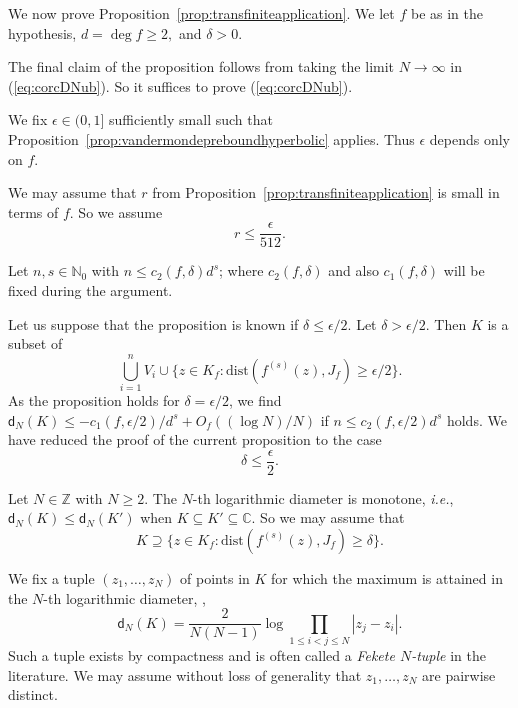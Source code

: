 \documentclass[12pt,oneside,a4]{amsart}
\newcommand{\IC}{\mathbb{C}}
\newcommand{\IN}{\mathbb{N}}
\newcommand{\IZ}{\mathbb{Z}}
\numberwithin{maincounter}{section}
\numberwithin{equation}{section}
\renewcommand{\subset}{\subseteq}
\renewcommand{\supset}{\supseteq}
\begin{document}
We now prove Proposition~\ref{prop:transfiniteapplication}. We let $f$
be as in the hypothesis, $d=\deg f\ge 2,$ and $\delta >0$. 

The final claim of the proposition follows from taking the limit
$N\rightarrow \infty$ in (\ref{eq:corcDNub}). So
it suffices to prove (\ref{eq:corcDNub}). 

We fix $\epsilon \in (0,1]$  sufficiently small such that
Proposition~\ref{prop:vandermondepreboundhyperbolic} applies.
Thus $\epsilon$ depends only on $f$. 


We may assume that $r$ 
from Proposition~\ref{prop:transfiniteapplication}
is small in terms of $f$. So we assume
\begin{equation*}
  r\le \frac{\epsilon}{512}.
\end{equation*}

Let $n,s\in\IN_0$ with $n\le c_2(f,\delta)d^s$; where $c_2(f,\delta)$
and also $c_1(f,\delta)$ will be fixed during the argument.

Let us suppose that the proposition is known if $\delta\le \epsilon/2$. Let
$\delta > \epsilon /2$. Then  $K$ is a subset of 
\begin{equation*}
  \bigcup_{i=1}^n {V_i} \cup \{z\in K_f :
  \mathrm{dist}(f^{(s)}(z),J_f)\ge\epsilon /2\}.
\end{equation*}
As the proposition holds for $\delta=\epsilon/2$, we find 
$\mathsf{d}_N(K)\le -c_1(f,\epsilon/2)/d^s + O_{f}((\log
N)/N)$ if $n\le c_2(f,\epsilon/2)d^s$ holds.
We have reduced the proof of the current proposition to the case
\begin{equation}
  \label{eq:deltaepshalf}
  \delta \le \frac{\epsilon}{2}.
\end{equation}



Let $N\in\IZ$ with $N\ge 2$. The $N$-th logarithmic diameter is
monotone, \textit{i.e.}, $\mathsf{d}_N(K)\le \mathsf{d}_N(K')$ when
$K\subset K'\subset \IC$. So we may assume that
\begin{equation}
  \label{eq:Kisdeltafilled}
  K \supset \{z\in K_f :    \mathrm{dist}(f^{(s)}(z),J_f)\ge \delta\}.
\end{equation}

We fix a tuple $(z_1,\ldots,z_N)$ of points in $K$ for which the
maximum is attained in the $N$-th logarithmic diameter, , 
\begin{equation}
  \label{eq:feketechoice}
  \mathsf{d}_N(K) = \frac{2}{N(N-1)} \log\prod_{1\le i<j\le N} |z_j-z_i|.
\end{equation}
Such a tuple exists by compactness and is often called a
\textit{Fekete $N$-tuple} in the literature. We may assume without
loss of generality that $z_1,\ldots,z_N$ are pairwise distinct.
\end{document}
